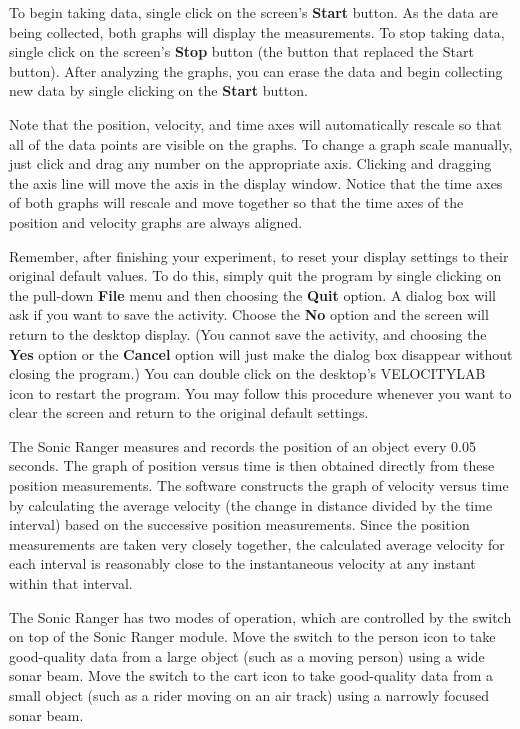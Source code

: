 To begin taking data, single click on the screen's \textbf{Start} button. As the data are being collected, both graphs will display the measurements. To stop taking data, single click on the screen's \textbf{Stop} button (the button that replaced the Start button). After analyzing the graphs, you can erase the data and begin collecting new data by single clicking on the \textbf{Start} button. \myskip

Note that the position, velocity, and time axes will automatically rescale so that all of the data points are visible on the graphs.  To change a graph scale manually, just click and drag any number on the appropriate axis.  Clicking and dragging the axis line will move the axis in the display window.  Notice that the time axes of both graphs will rescale and move together so that the time axes of the position and velocity graphs are always aligned. \myskip

Remember, after finishing your experiment, to reset your display settings to their original default values.  To do this, simply quit the program by single clicking on the pull-down \textbf{File} menu and then choosing the \textbf{Quit} option.  A dialog box will ask if you want to save the activity.  Choose the \textbf{No} option and the screen will return to the desktop display.  (You cannot save the activity, and choosing the \textbf{Yes} option or the \textbf{Cancel} option will just make the dialog box disappear without closing the program.)  You can double click on the desktop's VELOCITYLAB icon to restart the program.  You may follow this procedure whenever you want to clear the screen and return to the original default settings.

The Sonic Ranger measures and records the position of an object every 0.05 seconds.  The graph of position versus time is then obtained directly from these position measurements.  The software constructs the graph of velocity versus time by calculating the average velocity (the change in distance divided by the time interval) based on the successive position measurements.  Since the position measurements are taken very closely together, the calculated average velocity for each interval is reasonably close to the instantaneous velocity at any instant within that interval. \myskip

The Sonic Ranger has two modes of operation, which are controlled by the switch on top of the Sonic Ranger module.  Move the switch to the person icon to take good-quality data from a large object (such as a moving person) using a wide sonar beam.  Move the switch to the cart icon to take good-quality data from a small object (such as a rider moving on an air track) using a narrowly focused sonar beam. \myskip


